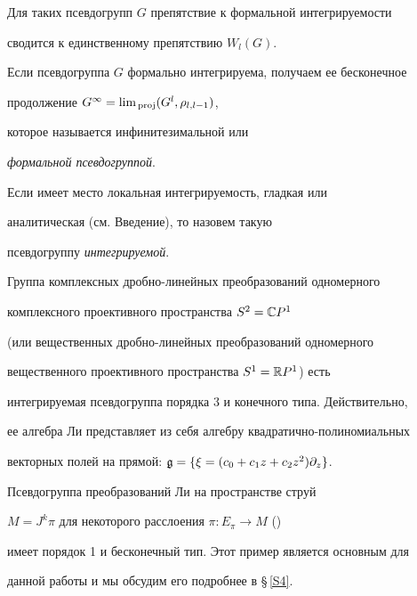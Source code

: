Для таких псевдогрупп $G$ препятствие к формальной интегрируемости


сводится к единственному препятствию $W_l(G)$.





Если псевдогруппа $G$ формально интегрируема, получаем ее бесконечное


продолжение $G^\infty=\lim_{\mathop{\mathrm{\,proj}}\nolimits}(G^l,\rho_{l,l-1})$,


которое называется инфинитезимальной или


{\em формальной псевдогруппой}.


Если имеет место локальная интегрируемость, гладкая или


аналитическая (см. Введение), то назовем такую


псевдогруппу {\em интегрируемой}.





\begin{exam}


Группа комплексных дробно-линейных преобразований одномерного


комплексного проективного пространства $S^2={\Bbb C} P^1$


(или вещественных дробно-линейных преобразований одномерного


вещественного проективного пространства $S^1={\Bbb R} P^1$) есть


интегрируемая псевдогруппа порядка 3 и конечного типа. Действительно,


ее алгебра Ли представляет из себя алгебру квадратично-полиномиальных


векторных полей на прямой: ${\frak g}=\{\xi=(c_0+c_1z+c_2z^2)\partial_z\}$.


\end{exam}





\begin{exam}


Псевдогруппа преобразований Ли на пространстве струй


$M=J^k\pi$ для некоторого расслоения $\pi:E_\pi\to M$ (\cite{KLV})


имеет порядок 1 и бесконечный тип. Этот пример является основным для


данной работы и мы обсудим его подробнее в \S\,\ref{S4}.


\end{exam}





